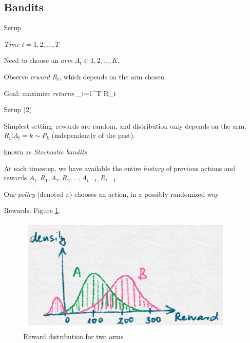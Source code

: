 \documentclass[english]{article}
\begin{document}
\eenum

\subsection{Bandits}

\benum

\item {Setup}
\bitem
\item \emph{Time} $t=1,2,\ldots,T$
\item Need to choose an \emph{arm} $A_t \in  1, 2, \ldots, K$, 
\item Observe \emph{reward} $R_t$, which depends on the arm chosen
\item Goal: maximize \emph{returns}
\beqs
\max \sum_{t=1}^T R_t
\eeqs
\eitem



\item {Setup (2)}
\bitem
\item Simplest setting: rewards are random, and distribution only depends on the arm. $R_t|A_t = k \sim P_k$ (independently of the past). 
\item known as \emph{Stochastic bandits}
\item At each timestep, we have available the entire \emph{history} of previous actions and rewards $A_1,R_1,A_2,R_2,\ldots, A_{t-1}, R_{t-1}$
\item Our \emph{policy} (denoted $\pi$) chooses an action, in a possibly randomized way 
\eitem



\item {Rewards}. Figure \ref{rewards}.
\begin{figure}[h!]
\begin{center}
\includegraphics[width=0.3\paperwidth]{den}
    \caption{Reward distribution for two arms}
    \label{rewards}
\end{center}
\end{figure}
\end{document}
